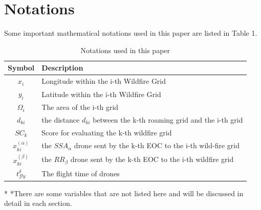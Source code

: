 \documentclass[12pt]{article}  %
\begin{document}
\section{Notations}
Some important mathematical notations used in this paper are listed in Table 1. 
\begin{table}[htbp]
    \begin{center}
        \caption{Notations used in this paper}
        \begin{tabular}{c l}
            \toprule[2pt]
            \multicolumn{1}{m{3cm}}{\centering Symbol}
                                  & \multicolumn{1}{m{8cm}}{\centering Description }                       \\
            \midrule
            $x_i$                 & Longitude within the i-th Wildfire Grid                                \\
            $y_i$                 & Latitude within the i-th Wildfire Grid                                 \\
            $\varOmega _i$        & The area of the i-th grid                                              \\
            $d_{ki}$              & the distance $d_{ki}$ between the k-th roaming grid and the i-th grid  \\
            $SC_k$                & Score for evaluating the k-th wildfire grid                            \\
            \vspace{5pt}%
            $x^{( \alpha )}_{ki}$ & the $SSA_\alpha$ drone sent by the k-th EOC to the i-th wild-fire grid \\
            \vspace{3pt}
            $x^{( \beta )}_{ki}$  & the $RR_\beta$ drone sent by the k-th EOC to the i-th wildfire grid    \\
            $t_{fly}^{\delta}$    & The flight time of drones                                              \\
            \bottomrule[2pt]
        \end{tabular}\label{tb:notation}
        \begin{tablenotes}
            \footnotesize
            \item[*] *There are some variables that are not listed here and will be discussed in detail in each section. %
        \end{tablenotes}
    \end{center}
\end{table}
\vspace{-1cm}%
\end{document}
